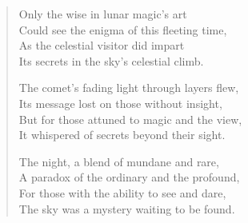 \vspace*{\fill}
\begin{verse}
Only the wise in lunar magic's art \\
Could see the enigma of this fleeting time, \\
As the celestial visitor did impart \\
Its secrets in the sky's celestial climb.

The comet's fading light through layers flew, \\
Its message lost on those without insight, \\
But for those attuned to magic and the view, \\
It whispered of secrets beyond their sight.

The night, a blend of mundane and rare, \\
A paradox of the ordinary and the profound, \\
For those with the ability to see and dare, \\
The sky was a mystery waiting to be found.
\end{verse}
\vspace*{\fill}
